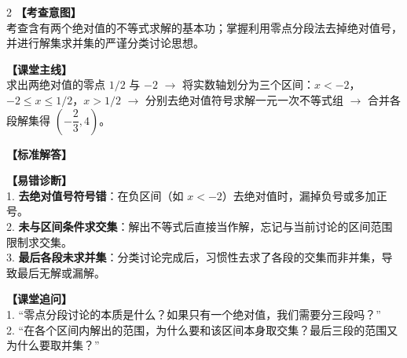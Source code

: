 \documentclass[12pt,a4paper]{ctexart}
\begin{document}
\begin{paracol}{2}
  \textbf{【考查意图】}\\
  考查含有两个绝对值的不等式求解的基本功；掌握利用零点分段法去掉绝对值号，并进行解集求并集的严谨分类讨论思想。
  
  \textbf{【课堂主线】}\\
  求出两绝对值的零点 \(1/2\) 与 \(-2\) \(\to\) 将实数轴划分为三个区间：\(x < -2\)，\(-2 \leqslant x \leqslant 1/2\)，\(x > 1/2\) \(\to\) 分别去绝对值符号求解一元一次不等式组 \(\to\) 合并各段解集得 \(\left(-\dfrac{2}{3}, 4\right)\)。
  
  \textbf{【标准解答】}\\
  \qSevenSolution

  \switchcolumn
  \textbf{【易错诊断】}\\
  1. \textbf{去绝对值号符号错}：在负区间（如 \(x < -2\)）去绝对值时，漏掉负号或多加正号。\\
  2. \textbf{未与区间条件求交集}：解出不等式后直接当作解，忘记与当前讨论的区间范围限制求交集。\\
  3. \textbf{最后各段未求并集}：分类讨论完成后，习惯性去求了各段的交集而非并集，导致最后无解或漏解。
  
  \textbf{【课堂追问】}\\
  1. “零点分段讨论的本质是什么？如果只有一个绝对值，我们需要分三段吗？”\\
  2. “在各个区间内解出的范围，为什么要和该区间本身取交集？最后三段的范围又为什么要取并集？”
\end{paracol}

\vspace{0.8em}
\par{}
\vspace{0.8em}

\qEightStem
\end{document}
